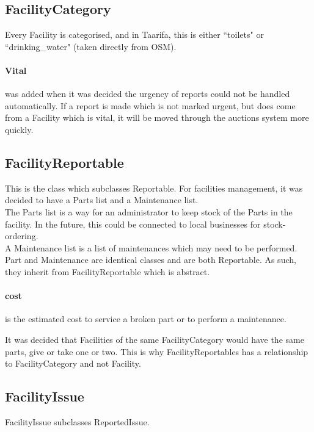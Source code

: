 \subsection{FacilityCategory} Every Facility is categorised, and in Taarifa, this is either ``toilets" or ``drinking\_water" (taken directly from \gls{OSM}). \\

\paragraph{Vital} was added when it was decided the urgency of reports could not be handled automatically. If a report is made which is not marked urgent, but does come from a Facility which is vital, it will be moved through the auctions system more quickly. \\

\subsection{FacilityReportable}
This is the class which subclasses Reportable. For facilities management, it was decided to have a Parts list and a Maintenance list. \\

The Parts list is a way for an administrator to keep stock of the Parts in the facility. In the future, this could be connected to local businesses for stock-ordering. \\

A Maintenance list is a list of maintenances which may need to be performed. Part and Maintenance are identical classes and are both Reportable. As such, they inherit from FacilityReportable which is abstract.

\paragraph{cost} is the estimated cost to service a broken part or to perform a maintenance.

It was decided that Facilities of the same FacilityCategory would have the same parts, give or take one or two. This is why FacilityReportables has a relationship to FacilityCategory and not Facility.

\subsection{FacilityIssue}
FacilityIssue subclasses ReportedIssue.

